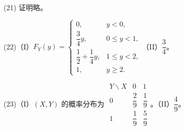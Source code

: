 \documentclass[UTF8,12pt]{ctexart}
\begin{document}
(21) 证明略。


(22)（I）\(\displaystyle F_Y(y)=\begin{cases}0,\allowbreak &y<0,\allowbreak \\\dfrac{\displaystyle 3}{\displaystyle 4}y,\allowbreak &0\leq y<1,\allowbreak \\\dfrac{\displaystyle 1}{\displaystyle 2}+\dfrac{\displaystyle 1}{\displaystyle 4}y,\allowbreak &1\leq y<2,\allowbreak \\1,\allowbreak &y\geq2.\end{cases}\)（II）\(\displaystyle \dfrac{\displaystyle 3}{\displaystyle 4}\)。


(23)（I）\(\displaystyle (X,\allowbreak Y)\) 的概率分布为 \(\displaystyle \begin{array}{c|cc}Y\backslash X&0&1\\\hline 0&\dfrac{\displaystyle 2}{\displaystyle 9}&\dfrac{\displaystyle 1}{\displaystyle 9}\\1&\dfrac{\displaystyle 1}{\displaystyle 9}&\dfrac{\displaystyle 5}{\displaystyle 9}\end{array}\)。（II）\(\displaystyle \dfrac{\displaystyle 4}{\displaystyle 9}\)。


\clearpage
\end{document}
